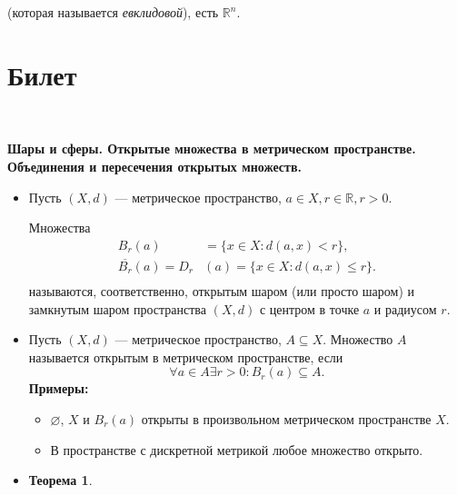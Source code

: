 \documentclass[a4paper,100pt]{article}
\theoremstyle{indented}
\newtheorem{theorem}{Теорема}
\begin{document}
(которая называется \textit{евклидовой}), есть $\mathbb{R}^n$.

\section{Билет} \

\medskip

\textbf{Шары и сферы. Открытые множества в метрическом пространстве. Объединения и пересечения открытых множеств.}
    \begin{itemize}
    \item Пусть $\left(X, d\right)$ --- метрическое пространство, $a \in X, r \in \mathbb R, r > 0.$
    
    Множества 
    \[
    \begin{aligned}
        B_r(a) &= \{x \in X : d(a,x) < r\}, \\
        \overline{B_r} (a) = D_r &(a) = \{x \in X: d(a,x) \leq r\}. \\
    \end{aligned}
    \]
    называются, соответственно, открытым \hypertarget{n3}{шаром} (или просто шаром) и замкнутым шаром пространства $\left(X,d\right)$ с центром в точке $a$ и радиусом $r$.
    \item Пусть $\left(X, d\right)$ --- метрическое пространство, $A \subseteq X$. Множество $A$ называется \hypertarget{n4}{открытым} в метрическом пространстве, если
    \[
        \forall a \in A \exists r > 0: B_r(a) \subseteq A.
    \]
    \textbf{Примеры:} \begin{itemize}
        \item $\varnothing$, $X$ и $B_r(a)$ открыты в произвольном метрическом пространстве $X$.
        \item В пространстве с дискретной метрикой любое множество открыто.
    \end{itemize}
    \item 
    \begin{theorem}
    

\end{theorem}
\end{itemize}
\end{document}
